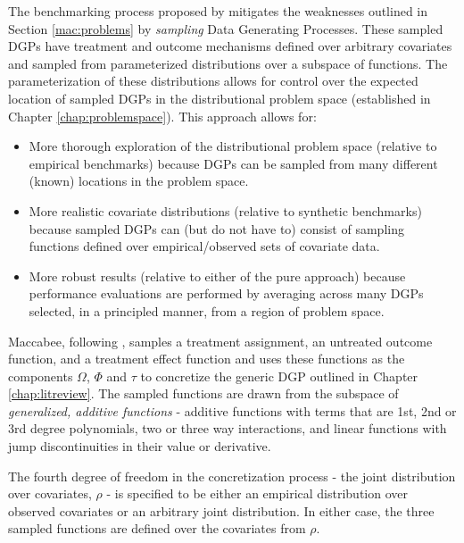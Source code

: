 \documentclass[../main.tex]{subfiles}
\begin{document}
The benchmarking process proposed by \textcite{Dorie2019Automated1} mitigates the weaknesses outlined in Section \ref{mac:problems} by \textit{sampling} Data Generating Processes. These sampled DGPs have treatment and outcome mechanisms defined over arbitrary covariates and sampled from parameterized distributions over a subspace of functions. The parameterization of these distributions allows for control over the expected location of sampled DGPs in the distributional problem space (established in Chapter \ref{chap:problemspace}). This approach allows for:

\begin{itemize}
    \item More thorough exploration of the distributional problem space (relative to empirical benchmarks) because DGPs can be sampled from many different (known) locations in the problem space.

    \item More realistic covariate distributions (relative to synthetic benchmarks) because sampled DGPs can (but do not have to) consist of sampling functions defined over empirical/observed sets of covariate data.

    \item More robust results (relative to either of the pure approach) because performance evaluations are performed by averaging across many DGPs selected, in a principled manner, from a region of problem space.
\end{itemize}

Maccabee, following \textcite{Dorie2019Automated1}, samples a treatment assignment, an untreated outcome function, and a treatment effect function and uses these functions as the components $\Omega$, $\Phi$ and $\tau$ to concretize the generic DGP outlined in Chapter \ref{chap:litreview}. The sampled functions are drawn from the subspace of \textit{generalized, additive functions} - additive functions with terms that are 1st, 2nd or 3rd degree polynomials, two or three way interactions, and linear functions with jump discontinuities in their value or derivative.

\vspace{\baselineskip}

The fourth degree of freedom in the concretization process - the joint distribution over covariates, $\rho$ - is specified to be either an empirical distribution over observed covariates or an arbitrary joint distribution. In either case, the three sampled functions are defined over the covariates from $\rho$.
\end{document}
